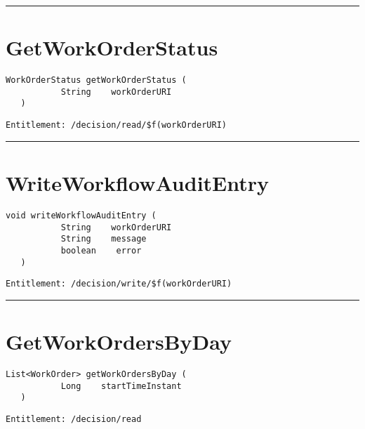 \rule{12cm}{2pt}
\section{GetWorkOrderStatus}
\label{Api:GetWorkOrderStatus}
\begin{lstlisting}[style=nonumbers]
   WorkOrderStatus getWorkOrderStatus (
           String    workOrderURI
   )
\end{lstlisting}
\begin{Verbatim}[formatcom=\color{Maroon}]
  Entitlement: /decision/read/$f(workOrderURI)
\end{Verbatim}



\rule{12cm}{2pt}
\section{WriteWorkflowAuditEntry}
\label{Api:WriteWorkflowAuditEntry}
\begin{lstlisting}[style=nonumbers]
   void writeWorkflowAuditEntry (
           String    workOrderURI
           String    message
           boolean    error
   )
\end{lstlisting}
\begin{Verbatim}[formatcom=\color{Maroon}]
  Entitlement: /decision/write/$f(workOrderURI)
\end{Verbatim}



\rule{12cm}{2pt}
\section{GetWorkOrdersByDay}
\label{Api:GetWorkOrdersByDay}
\begin{lstlisting}[style=nonumbers]
   List<WorkOrder> getWorkOrdersByDay (
           Long    startTimeInstant
   )
\end{lstlisting}
\begin{Verbatim}[formatcom=\color{Maroon}]
  Entitlement: /decision/read
\end{Verbatim}



